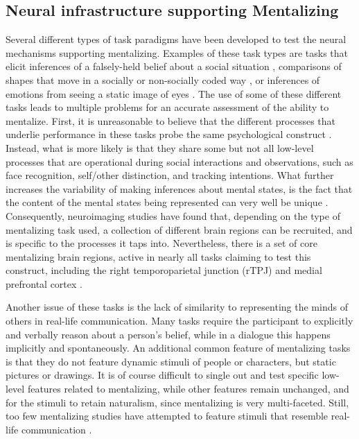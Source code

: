 \subsection{Neural infrastructure supporting Mentalizing}

Several different types of task paradigms have been developed to test the neural mechanisms supporting mentalizing. Examples of these task types are tasks that elicit inferences of a falsely-held belief about a social situation \citep[False Belief task; ][]{baron-cohen1985}, comparisons of shapes that move in a socially or non-socially coded way \citep[Social Animations task; ][]{castelli2002}, or inferences of emotions from seeing a static image of eyes \citep[Reading the Mind in the Eyes task, or RMET; ][]{baron-cohen2001RMET}. The use of some of these different tasks leads to multiple problems for an accurate assessment of the ability to mentalize. First, it is unreasonable to believe that the different processes that underlie performance in these tasks probe the same psychological construct \citep{schaafsma2015}. Instead, what is more likely is that they share some but not all low-level processes that are operational during social interactions and observations, such as face recognition, self/other distinction, and tracking intentions. What further increases the variability of making inferences about mental states, is the fact that the content of the mental states being represented can very well be unique \citep{conway2019}. Consequently, neuroimaging studies have found that, depending on the type of mentalizing task used, a collection of different brain regions can be recruited, and is specific to the processes it taps into. Nevertheless, there is a set of core mentalizing brain regions, active in nearly all tasks claiming to test this construct, including the right temporoparietal junction (rTPJ) and medial prefrontal cortex \citep[mPFC; ][]{schurz2014}. 


Another issue of these tasks is the lack of similarity to representing the minds of others in real-life communication. Many tasks require the participant to explicitly and verbally reason about a person’s belief, while in a dialogue this happens implicitly and spontaneously. An additional common feature of mentalizing tasks is that they do not feature dynamic stimuli of people or characters, but static pictures or drawings. It is of course difficult to single out and test specific low-level features related to mentalizing, while other features remain unchanged, and for the stimuli to retain naturalism, since mentalizing is very multi-faceted. Still, too few mentalizing studies have attempted to feature stimuli that resemble real-life communication \citep{gernsbacher2019,conway2019}.

